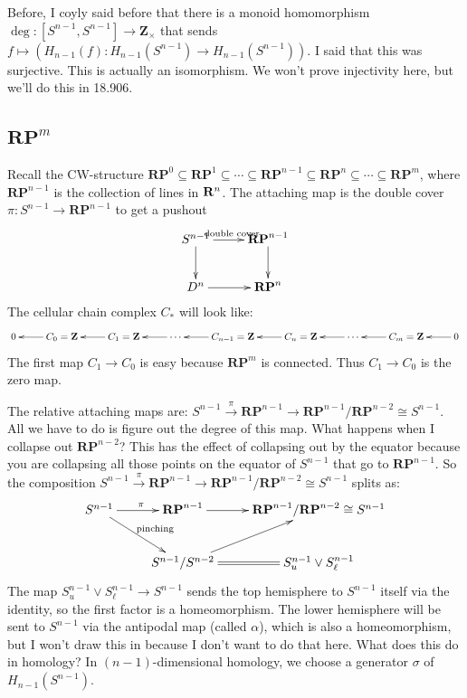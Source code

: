 \documentclass{amsart}
\theoremstyle{theorem}
\theoremstyle{definition}
\newcommand{\RP}{\mathbf{RP}}
\newcommand{\Z}{\mathbf Z}
\begin{document}
Before, I coyly said before that there is a monoid homomorphism $\deg:[S^{n-1},S^{n-1}]\to\Z_\times$ that sends $f\mapsto ( H_{n-1}(f): H_{n-1}(S^{n-1})\to H_{n-1}(S^{n-1}))$. I said that this was surjective. This is actually an isomorphism. We won't prove injectivity here, but we'll do this in 18.906.
\subsection{$\RP^m$}
Recall the CW-structure $\RP^0\subseteq\RP^1\subseteq\cdots\subseteq\RP^{n-1}\subseteq\RP^n\subseteq \cdots\subseteq\RP^m$, where $\RP^{n-1}$ is the collection of lines in $\mathbf R^n$. The attaching map is the double cover $\pi:S^{n-1}\to\RP^{n-1}$ to get a pushout
\begin{equation*}
\xymatrix{S^{n-1}\ar[r]^{\text{double cover}}\ar[d] & \RP^{n-1}\ar[d]\\
D^n\ar[r] & \RP^n}
\end{equation*}
The cellular chain complex $C_\ast$ will look like:
\begin{equation*}
\xymatrix{0 & C_0=\Z\ar[l] & C_1=\Z\ar[l] & \cdots\ar[l] & C_{n-1}=\Z\ar[l] & C_n=\Z\ar[l] & \cdots\ar[l] & C_m=\Z\ar[l] & 0\ar[l]}
\end{equation*}
The first map $C_1\to C_0$ is easy because $\RP^m$ is connected. Thus $C_1\to C_0$ is the zero map.

The relative attaching maps are: $S^{n-1}\xrightarrow{\pi}\RP^{n-1}\to \RP^{n-1}/\RP^{n-2}\cong S^{n-1}$. All we have to do is figure out the degree of this map. What happens when I collapse out $\RP^{n-2}$? This has the effect of collapsing out by the equator because you are collapsing all those points on the equator of $S^{n-1}$ that go to $\RP^{n-1}$. So the composition $S^{n-1}\xrightarrow{\pi}\RP^{n-1}\to \RP^{n-1}/\RP^{n-2}\cong S^{n-1}$ splits as:
\begin{equation*}
\xymatrix{S^{n-1}\ar[r]^{\pi}\ar[dr]^{\text{pinching}} & \mathbf{RP}^{n-1}\ar[r] & \RP^{n-1}/\RP^{n-2}\cong S^{n-1}\\
 & S^{n-1}/S^{n-2}\ar[ur]\ar@{=}[r] & S^{n-1}_u\vee S^{n-1}_\ell}
\end{equation*}
The map $S^{n-1}_u\vee S^{n-1}_\ell\to S^{n-1}$ sends the top hemisphere to $S^{n-1}$ itself via the identity, so the first factor is a homeomorphism. The lower hemisphere will be sent to $S^{n-1}$ via the antipodal map (called $\alpha$), which is also a homeomorphism, but I won't draw this in because I don't want to do that here. What does this do in homology? In $(n-1)$-dimensional homology, we choose a generator $\sigma$ of $ H_{n-1}(S^{n-1})$.
\end{document}
